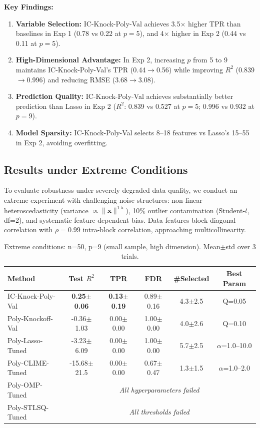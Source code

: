 \textbf{Key Findings:}
\begin{enumerate}
    \item \textbf{Variable Selection:} IC-Knock-Poly-Val achieves 3.5$\times$ higher TPR than baselines in Exp 1 (0.78 vs 0.22 at $p=5$), and 4$\times$ higher in Exp 2 (0.44 vs 0.11 at $p=5$).
    \item \textbf{High-Dimensional Advantage:} In Exp 2, increasing $p$ from 5 to 9 maintains IC-Knock-Poly-Val's TPR (0.44$\rightarrow$0.56) while improving $R^2$ (0.839$\rightarrow$0.996) and reducing RMSE (3.68$\rightarrow$3.08).
    \item \textbf{Prediction Quality:} IC-Knock-Poly-Val achieves substantially better prediction than Lasso in Exp 2 ($R^2$: 0.839 vs 0.527 at $p=5$; 0.996 vs 0.932 at $p=9$).
    \item \textbf{Model Sparsity:} IC-Knock-Poly-Val selects 8--18 features vs Lasso's 15--55 in Exp 2, avoiding overfitting.
\end{enumerate}

\subsection{Results under Extreme Conditions}
\label{subsec:extreme}

To evaluate robustness under severely degraded data quality, we conduct an extreme experiment with challenging noise structures: non-linear heteroscedasticity (variance $\propto \|\mathbf{x}\|^{1.5}$), 10\% outlier contamination (Student-$t$, df=2), and systematic feature-dependent bias. Data features block-diagonal correlation with $\rho=0.99$ intra-block correlation, approaching multicollinearity.

\begin{table}[htbp]
\centering
\caption{Extreme conditions: n=50, p=9 (small sample, high dimension). Mean$\pm$std over 3 trials.}
\label{tab:extreme-high-dim}
\small
\begin{tabular}{lccccc}
\toprule
\textbf{Method} & \textbf{Test $R^2$} & \textbf{TPR} & \textbf{FDR} & \textbf{\#Selected} & \textbf{Best Param} \\
\midrule
IC-Knock-Poly-Val & \textbf{0.25$\pm$0.06} & \textbf{0.13$\pm$0.19} & 0.89$\pm$0.16 & 4.3$\pm$2.5 & Q=0.05 \\
Poly-Knockoff-Val & -0.36$\pm$1.03 & 0.00$\pm$0.00 & 1.00$\pm$0.00 & 4.0$\pm$2.6 & Q=0.10 \\
Poly-Lasso-Tuned & -3.23$\pm$6.09 & 0.00$\pm$0.00 & 1.00$\pm$0.00 & 5.7$\pm$2.5 & $\alpha$=1.0--10.0 \\
Poly-CLIME-Tuned & -15.68$\pm$21.5 & 0.00$\pm$0.00 & 0.67$\pm$0.47 & 1.3$\pm$1.5 & $\alpha$=1.0--2.0 \\
Poly-OMP-Tuned & \multicolumn{5}{c}{\textit{All hyperparameters failed}} \\
Poly-STLSQ-Tuned & \multicolumn{5}{c}{\textit{All thresholds failed}} \\
\bottomrule
\end{tabular}
\end{table}

